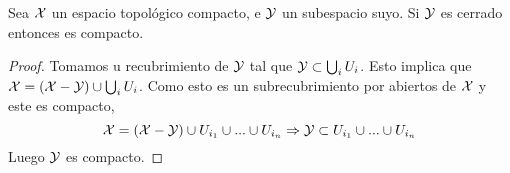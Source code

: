 \begin{prop}
	Sea $\mathcal{X}$ un espacio topológico compacto, e $\mathcal{Y}$ un subespacio suyo. Si $\mathcal{Y}$ es cerrado entonces es compacto.
	\begin{proof}
		Tomamos u recubrimiento de $\mathcal{Y}$ tal que $\mathcal{Y} \subset \bigcup_{i}U_i$. Esto implica que $\mathcal{X} = (\mathcal{X}-\mathcal{Y}) \cup \bigcup_{i}U_i$. Como esto es un subrecubrimiento por abiertos de $\mathcal{X}$ y este es compacto,
		\begin{equation}
			\mathcal{X} = (\mathcal{X}-\mathcal{Y}) \cup U_{i_1} \cup ... \cup U_{i_n} \Rightarrow \mathcal{Y} \subset U_{i_1} \cup ... \cup U_{i_n}
		\end{equation}
		Luego $\mathcal{Y}$ es compacto.
	\end{proof}
\end{prop}